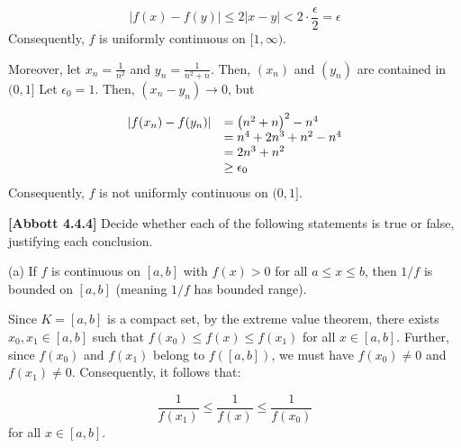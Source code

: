 \documentclass[10pt]{article}
\begin{document}
\begin{equation*}
|f( x) -f( y) |\leq 2|x-y|< 2\cdot \frac{\epsilon }{2} =\epsilon 
\end{equation*}
Consequently, $\displaystyle f$ is uniformly continuous on $\displaystyle [ 1,\infty )$.



Moreover, let $\displaystyle x_{n} =\frac{1}{n^{2}}$ and $ $$\displaystyle y_{n} =\frac{1}{n^{2} +n}$. Then, $\displaystyle ( x_{n})$ and $\displaystyle ( y_{n})$ are contained in $\displaystyle ( 0,1]$ Let $\displaystyle \epsilon _{0} =1$. Then, $\displaystyle ( x_{n} -y_{n})\rightarrow 0$, but 




\begin{equation*}
\begin{array}{ c l }
|f( x_{n}) -f( y_{n}) | & =\left( n^{2} +n\right)^{2} -n^{4}\\
 & =n^{4} +2n^{3} +n^{2} -n^{4}\\
 & =2n^{3} +n^{2}\\
 & \geq \epsilon _{0}
\end{array}
\end{equation*}
Consequently, $\displaystyle f$ is not uniformly continuous on $\displaystyle ( 0,1]$.



\textbf{[Abbott 4.4.4]} Decide whether each of the following statements is true or false, justifying each conclusion.



(a) If $\displaystyle f$ is continuous on $\displaystyle [ a,b]$ with $\displaystyle f( x)  >0$ for all $\displaystyle a\leq x\leq b$, then $\displaystyle 1/f$ is bounded on $\displaystyle [ a,b]$ (meaning $\displaystyle 1/f$ has bounded range). 



Since $\displaystyle K=[ a,b]$ is a compact set, by the extreme value theorem, there exists $\displaystyle x_{0} ,x_{1} \in [ a,b]$ such that $\displaystyle f( x_{0}) \leq f( x) \leq f( x_{1})$ for all $\displaystyle x\in [ a,b]$. Further, since $\displaystyle f( x_{0})$ and $\displaystyle f( x_{1})$ belong to $\displaystyle f([ a,b])$, we must have $\displaystyle f( x_{0}) \neq 0$ and $\displaystyle f( x_{1}) \neq 0$. Consequently, it follows that:


\begin{equation*}
\frac{1}{f( x_{1})} \leq \frac{1}{f( x)} \leq \frac{1}{f( x_{0})}
\end{equation*}
for all $\displaystyle x\in [ a,b]$.
\end{document}
